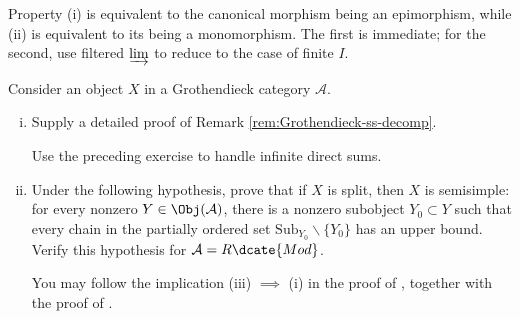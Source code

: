 \begin{Exercises}
	\begin{hint}
		Property (i) is equivalent to the canonical morphism being an
		epimorphism, while (ii) is equivalent to its being a monomorphism. The
		first is immediate; for the second, use filtered $\varinjlim$ to reduce
		to the case of finite $I$.
	\end{hint}

	\item Consider an object $X$ in a Grothendieck category $\mathcal{A}$.
	\begin{enumerate}[(i)]
		\item Supply a detailed proof of Remark
		\ref{rem:Grothendieck-ss-decomp}.
		\begin{hint}
			Use the preceding exercise to handle infinite direct sums.
		\end{hint}
		\item Under the following hypothesis, prove that if $X$ is split, then
		$X$ is semisimple: for every nonzero $Y\in\Obj(\mathcal{A})$, there is
		a nonzero subobject $Y_0\subset Y$ such that every chain in the
		partially ordered set $\mathrm{Sub}_{Y_0}\smallsetminus\{Y_0\}$ has an
		upper bound. Verify this hypothesis for $\mathcal{A}=R\dcate{Mod}$.
		\begin{hint}
			You may follow the implication (iii) $\implies$ (i) in the proof of
			\cite[Proposition 6.11.4]{Li1}, together with the proof of
			\cite[Lemma 6.11.3]{Li1}.
		\end{hint}
	\end{enumerate}
\end{Exercises}
